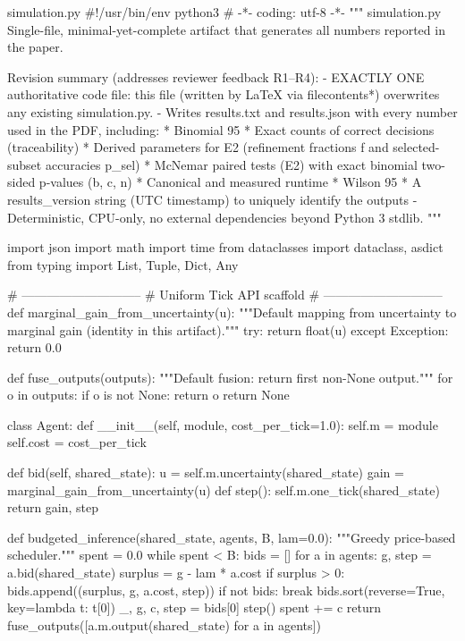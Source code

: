 \begin{filecontents*}{simulation.py}
#!/usr/bin/env python3
# -*- coding: utf-8 -*-
"""
simulation.py
Single-file, minimal-yet-complete artifact that generates all numbers reported in the paper.

Revision summary (addresses reviewer feedback R1–R4):
- EXACTLY ONE authoritative code file: this file (written by LaTeX via filecontents*) overwrites any existing simulation.py.
- Writes results.txt and results.json with every number used in the PDF, including:
  * Binomial 95%
  * Exact counts of correct decisions (traceability)
  * Derived parameters for E2 (refinement fractions f and selected-subset accuracies p_sel)
  * McNemar paired tests (E2) with exact binomial two-sided p-values (b, c, n)
  * Canonical and measured runtime
  * Wilson 95%
  * A results_version string (UTC timestamp) to uniquely identify the outputs
- Deterministic, CPU-only, no external dependencies beyond Python 3 stdlib.
"""

import json
import math
import time
from dataclasses import dataclass, asdict
from typing import List, Tuple, Dict, Any


# -----------------------------
# Uniform Tick API scaffold
# -----------------------------
def marginal_gain_from_uncertainty(u):
    """Default mapping from uncertainty to marginal gain (identity in this artifact)."""
    try:
        return float(u)
    except Exception:
        return 0.0


def fuse_outputs(outputs):
    """Default fusion: return first non-None output."""
    for o in outputs:
        if o is not None:
            return o
    return None


class Agent:
    def __init__(self, module, cost_per_tick=1.0):
        self.m = module
        self.cost = cost_per_tick

    def bid(self, shared_state):
        u = self.m.uncertainty(shared_state)
        gain = marginal_gain_from_uncertainty(u)
        def step():
            self.m.one_tick(shared_state)
        return gain, step


def budgeted_inference(shared_state, agents, B, lam=0.0):
    """Greedy price-based scheduler."""
    spent = 0.0
    while spent < B:
        bids = []
        for a in agents:
            g, step = a.bid(shared_state)
            surplus = g - lam * a.cost
            if surplus > 0:
                bids.append((surplus, g, a.cost, step))
        if not bids:
            break
        bids.sort(reverse=True, key=lambda t: t[0])
        _, g, c, step = bids[0]
        step()
        spent += c
    return fuse_outputs([a.m.output(shared_state) for a in agents])



\end{filecontents*}
